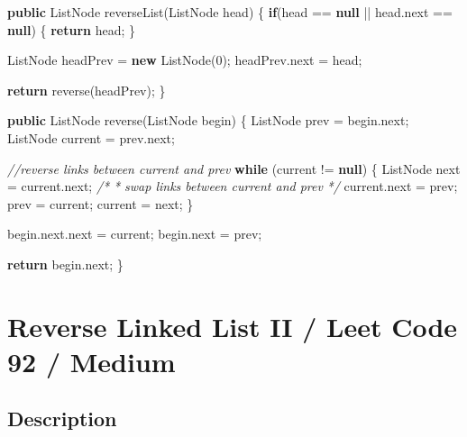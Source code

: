 \documentclass[]{book}
\newenvironment{Shaded}{\begin{snugshade}}{\end{snugshade}}
\newcommand{\CommentTok}[1]{\textcolor[rgb]{0.56,0.35,0.01}{\textit{#1}}}
\newcommand{\DecValTok}[1]{\textcolor[rgb]{0.00,0.00,0.81}{#1}}
\newcommand{\FunctionTok}[1]{\textcolor[rgb]{0.00,0.00,0.00}{#1}}
\newcommand{\KeywordTok}[1]{\textcolor[rgb]{0.13,0.29,0.53}{\textbf{#1}}}
\newcommand{\NormalTok}[1]{#1}
\begin{document}
\begin{Shaded}
\begin{Highlighting}[]
\KeywordTok{public}\NormalTok{ ListNode }\FunctionTok{reverseList}\NormalTok{(ListNode head) \{}
    \KeywordTok{if}\NormalTok{(head == }\KeywordTok{null}\NormalTok{ || head.}\FunctionTok{next}\NormalTok{ == }\KeywordTok{null}\NormalTok{) \{}
        \KeywordTok{return}\NormalTok{ head;}
\NormalTok{    \}}

\NormalTok{    ListNode headPrev = }\KeywordTok{new} \FunctionTok{ListNode}\NormalTok{(}\DecValTok{0}\NormalTok{);}
\NormalTok{    headPrev.}\FunctionTok{next}\NormalTok{ = head;}

    \KeywordTok{return} \FunctionTok{reverse}\NormalTok{(headPrev);}
\NormalTok{\}}

\KeywordTok{public}\NormalTok{ ListNode }\FunctionTok{reverse}\NormalTok{(ListNode begin) \{}
\NormalTok{    ListNode prev = begin.}\FunctionTok{next}\NormalTok{;}
\NormalTok{    ListNode current = prev.}\FunctionTok{next}\NormalTok{;}

    \CommentTok{//reverse links between current and prev}
    \KeywordTok{while}\NormalTok{ (current != }\KeywordTok{null}\NormalTok{) \{}
\NormalTok{        ListNode next = current.}\FunctionTok{next}\NormalTok{;}
        \CommentTok{/*}
\CommentTok{        * swap links between current and prev}
\CommentTok{        */}
\NormalTok{        current.}\FunctionTok{next}\NormalTok{ = prev;}
\NormalTok{        prev = current;}
\NormalTok{        current = next;}
\NormalTok{    \}}

\NormalTok{    begin.}\FunctionTok{next}\NormalTok{.}\FunctionTok{next}\NormalTok{ = current;}
\NormalTok{    begin.}\FunctionTok{next}\NormalTok{ = prev;}

    \KeywordTok{return}\NormalTok{ begin.}\FunctionTok{next}\NormalTok{;}
\NormalTok{\}}
\end{Highlighting}
\end{Shaded}

\hypertarget{reverse-linked-list-ii-leet-code-92-medium}{%
\section{Reverse Linked List II / Leet Code 92 / Medium}\label{reverse-linked-list-ii-leet-code-92-medium}}

\hypertarget{description-88}{%
\subsection{Description}\label{description-88}}
\end{document}
